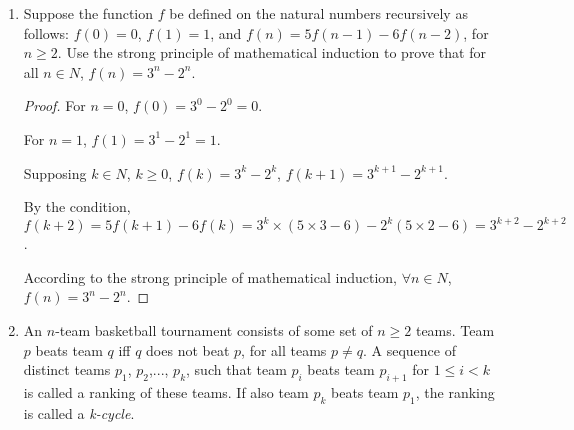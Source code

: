 \documentclass[12pt,a4paper]{article}
\theoremstyle{definition}
\begin{document}
\begin{enumerate}
\begin{proof}
        Since $k$ is the smallest value for which $P(k)$ is false, $P(k-2)$ is true. Thus $\exists i_0, \exists j_0$ s.t. $k-2=i_0\times 2+j_0\times 3$.
        
        However, we have
        \begin{equation*} 
         \begin{split}
                             k=(k-2)+2&=i_0\times 2+j_0\times 3+2\\
                                      &=(i_0+1)\times 2+j_0\times 3\\
                                      &=i_1\times 2+j_1\times 3
         \end{split}
        \end{equation*}
        Thus, $\exists i_1=i_0+1$ and $\exists j_1=j_0$, s.t. $k=i_1\times 2+j_1\times 3$. We have derived a contradiction,
which allows us to conclude that our original assumption is false. 


       To sum up, we can alaways find integers $i_n\ge 0$ and $j_n\ge 0$, such that $n = i_n \times 2 + j_n \times 3$.
    \end{proof}

    \item
    Suppose the function $f$ be defined on the natural numbers recursively as follows: $f(0)=0$, $f(1)=1$, and $f(n)=5f(n-1)-6f(n-2)$, for $n\geq 2$. Use the strong principle of mathematical induction to prove that for all $n\in N$, $f(n)=3^n-2^n$. 
    \begin{proof}
        For $n=0$, $f(0)=3^0-2^0=0$.

        For $n=1$, $f(1)=3^1-2^1=1$.

        Supposing $k\in N$, $k\ge 0$, $f(k)=3^k-2^k$, $f(k+1)=3^{k+1}-2^{k+1}$.

        By the condition, $f(k+2)=5f(k+1)-6f(k)=3^k \times (5\times 3-6)-2^k(5\times 2-6)=3^{k+2}-2^{k+2}$. 

        According to the strong principle of mathematical induction, $\forall n \in N$, $f(n)=3^n-2^n$.
    \end{proof}

    \item
    An $n$-team basketball tournament consists of some set of $n\geq2$ teams. Team $p$ beats team $q$ iff $q$
does not beat $p$, for all teams $p\neq q$. A sequence of distinct teams $p_{1}$, $p_{2}$,..., $p_{k}$, such that team $p_{i}$ beats team $p_{i+1}$ for $1\leq i<k$ is called a ranking of these teams. If also team $p_{k}$ beats team $p_{1}$, the ranking is called a \emph{k-cycle}. 


\end{enumerate}
\end{document}
